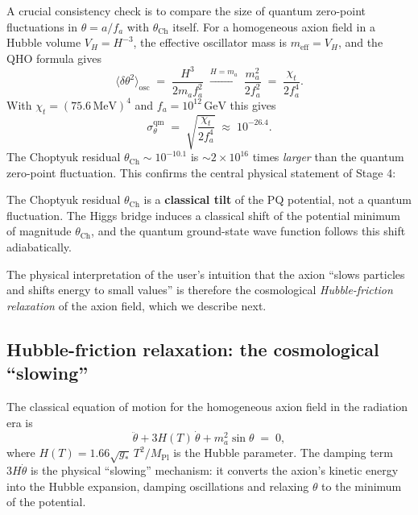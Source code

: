 A crucial consistency check is to compare the size of quantum
zero-point fluctuations in $\theta = a/f_a$ with $\theta_\mathrm{Ch}$
itself.  For a homogeneous axion field in a Hubble volume
$V_H = H^{-3}$, the effective oscillator mass is $m_\mathrm{eff} = V_H$,
and the QHO formula gives
\begin{equation}
\langle \delta\theta^2 \rangle_\mathrm{osc}
\;=\; \frac{H^3}{2 m_a f_a^2}
\;\xrightarrow{H = m_a}\;
\frac{m_a^2}{2 f_a^2}
\;=\; \frac{\chi_t}{2 f_a^4}.
\label{eq:quantum-fluctuation}
\end{equation}
With $\chi_t = (75.6\,\mathrm{MeV})^4$ and $f_a = 10^{12}\,\mathrm{GeV}$
this gives
\begin{equation}
\sigma_\theta^\mathrm{qm} \;=\; \sqrt{\frac{\chi_t}{2 f_a^4}}
\;\approx\; 10^{-26.4}.
\end{equation}
The Choptyuk residual $\theta_\mathrm{Ch} \sim 10^{-10.1}$ is
$\sim 2 \times 10^{16}$ times \emph{larger} than the quantum
zero-point fluctuation.  This confirms the central physical
statement of Stage 4:
\begin{verdict}
The Choptyuk residual $\theta_\mathrm{Ch}$ is a \textbf{classical
tilt} of the PQ potential, not a quantum fluctuation.  The
Higgs bridge induces a classical shift of the potential minimum
of magnitude $\theta_\mathrm{Ch}$, and the quantum ground-state
wave function follows this shift adiabatically.
\end{verdict}

The physical interpretation of the user's intuition that the axion
``slows particles and shifts energy to small values'' is therefore
the cosmological \emph{Hubble-friction relaxation} of the axion
field, which we describe next.

\subsection{Hubble-friction relaxation: the cosmological ``slowing''}

The classical equation of motion for the homogeneous axion field
in the radiation era is
\begin{equation}
\ddot\theta + 3 H(T)\,\dot\theta + m_a^2 \sin\theta \;=\; 0,
\label{eq:axion-eom}
\end{equation}
where $H(T) = 1.66 \sqrt{g_*}\,T^2 / M_\mathrm{Pl}$ is the Hubble
parameter.  The damping term $3 H \dot\theta$ is the physical
``slowing'' mechanism: it converts the axion's kinetic energy into
the Hubble expansion, damping oscillations and relaxing $\theta$
to the minimum of the potential.

